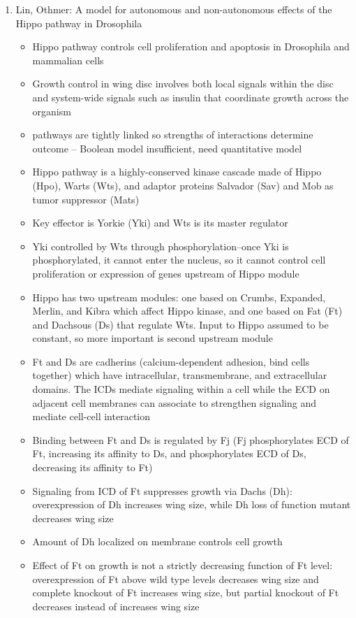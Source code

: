 \documentclass[12pt]{article}
\begin{document}
\begin{enumerate}
\item Lin, Othmer: A model for autonomous and non-autonomous effects of the Hippo pathway in Drosophila
\begin{itemize}
	\item Hippo pathway controls cell proliferation and apoptosis in Drosophila and mammalian cells
	\item Growth control in wing disc involves both local signals within the disc and system-wide signals such as insulin that coordinate growth across the organism
	\item pathways are tightly linked so strengths of interactions determine outcome -- Boolean model insufficient, need quantitative model
	\item Hippo pathway is a highly-conserved kinase cascade made of Hippo (Hpo), Warts (Wts), and adaptor proteins Salvador (Sav) and Mob as tumor suppressor (Mats)
	\item Key effector is Yorkie (Yki) and Wts is its master regulator
	\item Yki controlled by Wts through phosphorylation--once Yki is phosphorylated, it cannot enter the nucleus, so it cannot control cell proliferation or expression of genes upstream of Hippo module
	\item Hippo has two upstream modules: one based on Crumbs, Expanded, Merlin, and Kibra which affect Hippo kinase, and one based on Fat (Ft) and Dachsous (Ds) that regulate Wts. Input to Hippo assumed to be constant, so more important is second upstream module
	\item Ft and Ds are cadherins (calcium-dependent adhesion, bind cells together) which have intracellular, transmembrane, and extracellular domains. The ICDs mediate signaling within a cell while the ECD on adjacent cell membranes can associate to strengthen signaling and mediate cell-cell interaction
	\item Binding between Ft and Ds is regulated by Fj (Fj phosphorylates ECD of Ft, increasing its affinity to Ds, and phosphorylates ECD of Ds, decreasing its affinity to Ft)
	\item Signaling from ICD of Ft suppresses growth via Dachs (Dh): overexpression of Dh increases wing size, while Dh loss of function mutant decreases wing size
	\item Amount of Dh localized on membrane controls cell growth
	\item Effect of Ft on growth is not a strictly decreasing function of Ft level: overexpression of Ft above wild type levels decreases wing size and complete knockout of Ft increases wing size, but partial knockout of Ft decreases instead of increases wing size

\end{itemize}
\end{enumerate}
\end{document}
